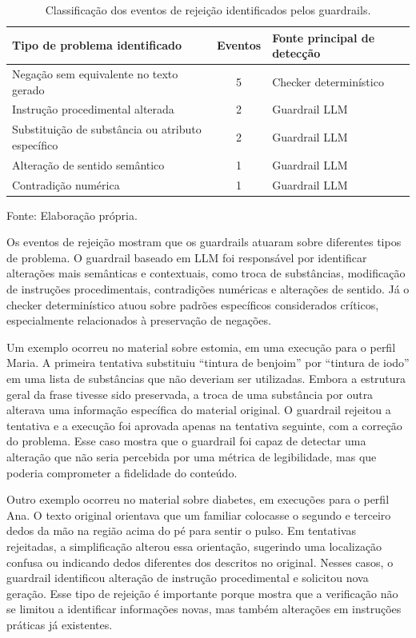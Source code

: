 \begin{table}[htbp]
  \centering
  \caption{Classificação dos eventos de rejeição identificados pelos guardrails.}
  \label{tab:eventos-rejeicao-guardrails}
  \small
  \begin{tabularx}{\textwidth}{XcX}
    \toprule
    \textbf{Tipo de problema identificado} & \textbf{Eventos} & \textbf{Fonte principal de detecção} \\
    \midrule
    Negação sem equivalente no texto gerado & 5 & Checker determinístico \\
    Instrução procedimental alterada & 2 & Guardrail LLM \\
    Substituição de substância ou atributo específico & 2 & Guardrail LLM \\
    Alteração de sentido semântico & 1 & Guardrail LLM \\
    Contradição numérica & 1 & Guardrail LLM \\
    \bottomrule
  \end{tabularx}

  {\footnotesize Fonte: Elaboração própria.}
\end{table}

Os eventos de rejeição mostram que os guardrails atuaram sobre diferentes tipos de problema. O guardrail baseado em LLM foi responsável por identificar alterações mais semânticas e contextuais, como troca de substâncias, modificação de instruções procedimentais, contradições numéricas e alterações de sentido. Já o checker determinístico atuou sobre padrões específicos considerados críticos, especialmente relacionados à preservação de negações.

Um exemplo ocorreu no material sobre estomia, em uma execução para o perfil Maria. A primeira tentativa substituiu ``tintura de benjoim'' por ``tintura de iodo'' em uma lista de substâncias que não deveriam ser utilizadas. Embora a estrutura geral da frase tivesse sido preservada, a troca de uma substância por outra alterava uma informação específica do material original. O guardrail rejeitou a tentativa e a execução foi aprovada apenas na tentativa seguinte, com a correção do problema. Esse caso mostra que o guardrail foi capaz de detectar uma alteração que não seria percebida por uma métrica de legibilidade, mas que poderia comprometer a fidelidade do conteúdo.

Outro exemplo ocorreu no material sobre diabetes, em execuções para o perfil Ana. O texto original orientava que um familiar colocasse o segundo e terceiro dedos da mão na região acima do pé para sentir o pulso. Em tentativas rejeitadas, a simplificação alterou essa orientação, sugerindo uma localização confusa ou indicando dedos diferentes dos descritos no original. Nesses casos, o guardrail identificou alteração de instrução procedimental e solicitou nova geração. Esse tipo de rejeição é importante porque mostra que a verificação não se limitou a identificar informações novas, mas também alterações em instruções práticas já existentes.

